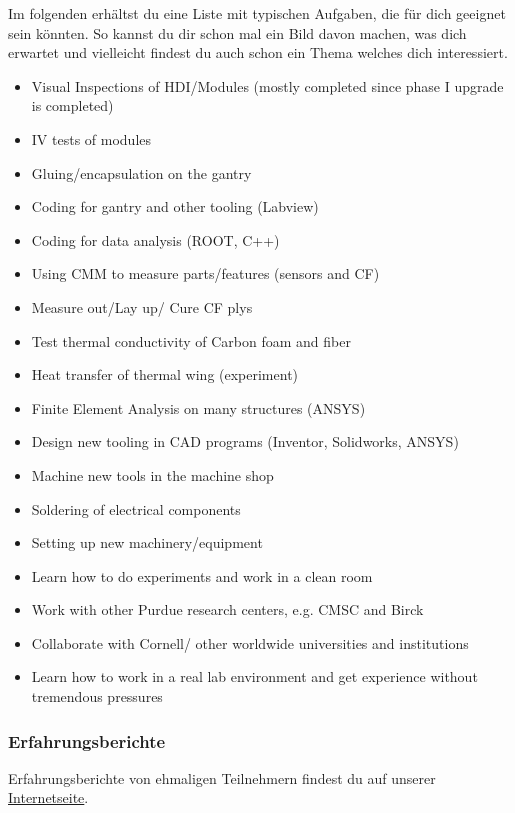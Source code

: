\documentclass[
  paper=a4,
  fontsize=12pt,
  DIV=16,
  headheight=52pt,
  footheight=45pt,
  headinclude,
  parskip=full,
]{scrartcl}
\begin{document}
Im folgenden erhältst du eine Liste mit typischen Aufgaben, die für dich geeignet sein könnten.
So kannst du dir schon mal ein Bild davon machen, was dich erwartet und vielleicht findest du auch schon ein Thema welches dich interessiert.
\begin{itemize}
  \item Visual Inspections of HDI/Modules (mostly completed since phase I
  upgrade is completed)
  \item IV tests of modules
  \item Gluing/encapsulation on the gantry
  \item Coding for gantry and other tooling (Labview)
  \item Coding for data analysis (ROOT, C++)
  \item Using CMM to measure parts/features (sensors and CF)
  \item Measure out/Lay up/ Cure CF plys
  \item Test thermal conductivity of Carbon foam and fiber
  \item Heat transfer of thermal wing (experiment)
  \item Finite Element Analysis on many structures (ANSYS)
  \item Design new tooling in CAD programs (Inventor, Solidworks, ANSYS)
  \item Machine new tools in the machine shop
  \item Soldering of electrical components
  \item Setting up new machinery/equipment
  \item Learn how to do experiments and work in a clean room
  \item Work with other Purdue research centers, e.g. CMSC and Birck
  \item Collaborate with Cornell/ other worldwide universities and institutions
  \item Learn how to work in a real lab environment and get experience without
  tremendous pressures
\end{itemize}

\subsubsection*{Erfahrungsberichte}
Erfahrungsberichte von ehmaligen Teilnehmern findest du auf unserer \href{https://pep-dortmund.org/stipendien/erfahrungsberichte.html} {Internetseite}.
\end{document}
